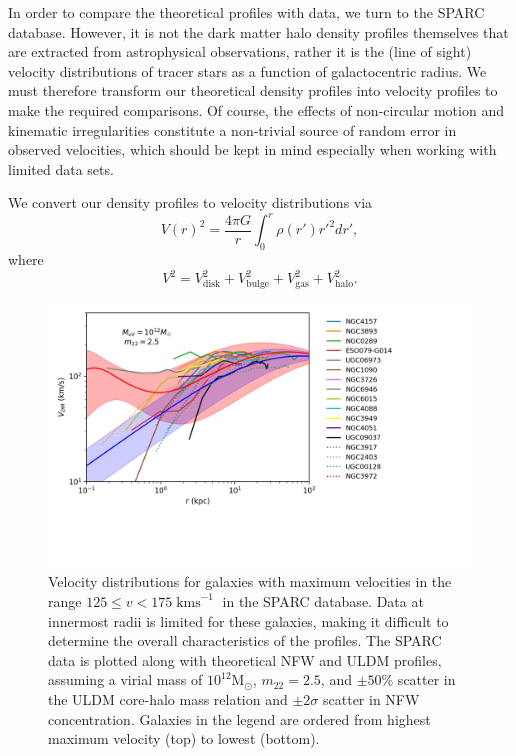 \documentclass{pasa}%
\begin{document}
In order to compare the theoretical profiles with data, we turn to the SPARC database. However, it is not the dark matter halo density profiles themselves that are extracted from astrophysical observations, rather it is the (line of sight) velocity distributions of tracer stars as a function of galactocentric radius. We must therefore transform our theoretical density profiles into velocity profiles to make the required comparisons. Of course, the effects of non-circular motion and kinematic irregularities constitute a non-trivial source of random error in observed velocities, which should be kept in mind especially when working with limited data sets. 

We convert our density profiles to velocity distributions \cite{Sofue:2008wt} via 
%
\begin{equation}
    V(r)^2 = \frac{4\pi G}{r}\int_0^r \rho(r')r'^2 dr',
\end{equation}
where 
\begin{equation}\label{eq:vel_decomp}
    V^2 = V_{\mathrm{disk}}^2 + V_{\mathrm{bulge}}^2 + V_{\mathrm{gas}}^2 + V_{\mathrm{halo}}^2.
\end{equation}
%

\begin{figure}[t]
\centering
\includegraphics[scale=0.9, trim={0cm 2.5cm 3cm 0cm}]{000_vs_SPARC_10_12.png}
\caption{Velocity distributions for galaxies with maximum velocities in the range $125 \leq v < 175\operatorname{kms}^{-1}$ in the SPARC database. Data at innermost radii is limited for these galaxies, making it difficult to determine the overall characteristics of the profiles. The SPARC data is plotted along with theoretical NFW and ULDM profiles, assuming a virial mass of $10^{12} \mathrm{M}_{\odot}$, $m_{22} = 2.5$, and $\pm 50 \%$ scatter in the ULDM core-halo mass relation and $\pm2\sigma$ scatter in NFW concentration. Galaxies in the legend are ordered from highest maximum velocity (top) to lowest (bottom).}\label{fig:high_v}
\end{figure}
\end{document}
